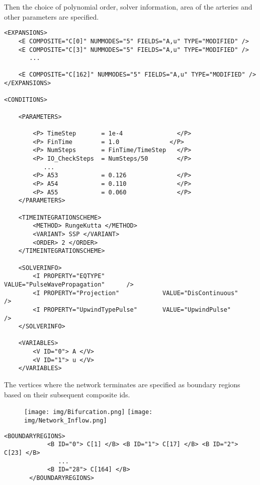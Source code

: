 Then the choice of polynomial order, solver information, area of the arteries
and other parameters are specified.

\begin{lstlisting}[style=XmlStyle]
<EXPANSIONS>
    <E COMPOSITE="C[0]" NUMMODES="5" FIELDS="A,u" TYPE="MODIFIED" />
    <E COMPOSITE="C[3]" NUMMODES="5" FIELDS="A,u" TYPE="MODIFIED" />
       ...

    <E COMPOSITE="C[162]" NUMMODES="5" FIELDS="A,u" TYPE="MODIFIED" />
</EXPANSIONS>

<CONDITIONS>

    <PARAMETERS>

        <P> TimeStep       = 1e-4               </P> 
        <P> FinTime        = 1.0              </P>
        <P> NumSteps       = FinTime/TimeStep   </P>
        <P> IO_CheckSteps  = NumSteps/50        </P>
           ...
        <P> A53            = 0.126              </P>
        <P> A54            = 0.110              </P>
        <P> A55            = 0.060              </P>
    </PARAMETERS>

    <TIMEINTEGRATIONSCHEME>
        <METHOD> RungeKutta </METHOD>
        <VARIANT> SSP </VARIANT>
        <ORDER> 2 </ORDER>
    </TIMEINTEGRATIONSCHEME>
        
    <SOLVERINFO>
        <I PROPERTY="EQTYPE"                VALUE="PulseWavePropagation"      />
        <I PROPERTY="Projection"            VALUE="DisContinuous"             />
        <I PROPERTY="UpwindTypePulse"       VALUE="UpwindPulse"               /> 
    </SOLVERINFO>

    <VARIABLES>
        <V ID="0"> A </V>
        <V ID="1"> u </V>
    </VARIABLES>

\end{lstlisting}

The vertices where the network terminates are specified as boundary regions
based on their subsequent composite ids.

\begin{figure}
	\texttt{[image: img/Bifurcation.png]}
	\texttt{[image: img/Network\_Inflow.png]}
\end{figure}

\begin{lstlisting}[style=XmlStyle]
        <BOUNDARYREGIONS>
            <B ID="0"> C[1] </B> <B ID="1"> C[17] </B> <B ID="2"> C[23] </B>
               ...
            <B ID="28"> C[164] </B>
       </BOUNDARYREGIONS>
\end{lstlisting}

